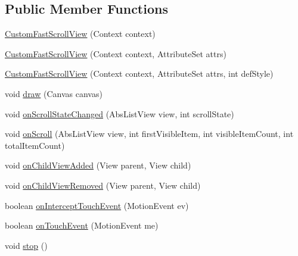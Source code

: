 \subsection*{Public Member Functions}
\begin{DoxyCompactItemize}
\item 
\hyperlink{classcom_1_1zia_1_1freshdocs_1_1widget_1_1fileexplorer_1_1_custom_fast_scroll_view_a114f68f78386547332db0fff12a2991c}{Custom\-Fast\-Scroll\-View} (Context context)
\item 
\hyperlink{classcom_1_1zia_1_1freshdocs_1_1widget_1_1fileexplorer_1_1_custom_fast_scroll_view_a99ae8d9d453d7d0a2f3802a06d158ce3}{Custom\-Fast\-Scroll\-View} (Context context, Attribute\-Set attrs)
\item 
\hyperlink{classcom_1_1zia_1_1freshdocs_1_1widget_1_1fileexplorer_1_1_custom_fast_scroll_view_af061f5da6dbf528f9f4c0c40cd817d33}{Custom\-Fast\-Scroll\-View} (Context context, Attribute\-Set attrs, int def\-Style)
\item 
void \hyperlink{classcom_1_1zia_1_1freshdocs_1_1widget_1_1fileexplorer_1_1_custom_fast_scroll_view_a68ebacb93e3d298573a817231efacf89}{draw} (Canvas canvas)
\item 
void \hyperlink{classcom_1_1zia_1_1freshdocs_1_1widget_1_1fileexplorer_1_1_custom_fast_scroll_view_a1ff6c4e50dbb20ccc50832903f2d0699}{on\-Scroll\-State\-Changed} (Abs\-List\-View view, int scroll\-State)
\item 
void \hyperlink{classcom_1_1zia_1_1freshdocs_1_1widget_1_1fileexplorer_1_1_custom_fast_scroll_view_a7bd566dc314f4a172d164b2edc3a3877}{on\-Scroll} (Abs\-List\-View view, int first\-Visible\-Item, int visible\-Item\-Count, int total\-Item\-Count)
\item 
void \hyperlink{classcom_1_1zia_1_1freshdocs_1_1widget_1_1fileexplorer_1_1_custom_fast_scroll_view_a409f6c2d1dc3374211dac21c1f67ea36}{on\-Child\-View\-Added} (View parent, View child)
\item 
void \hyperlink{classcom_1_1zia_1_1freshdocs_1_1widget_1_1fileexplorer_1_1_custom_fast_scroll_view_ad55999e80dbfc725dfe531cb2e092e52}{on\-Child\-View\-Removed} (View parent, View child)
\item 
boolean \hyperlink{classcom_1_1zia_1_1freshdocs_1_1widget_1_1fileexplorer_1_1_custom_fast_scroll_view_ab3e520889684661f2fb9c4db11c9a503}{on\-Intercept\-Touch\-Event} (Motion\-Event ev)
\item 
boolean \hyperlink{classcom_1_1zia_1_1freshdocs_1_1widget_1_1fileexplorer_1_1_custom_fast_scroll_view_a62c79de01209a48442cb9f3bfa36752d}{on\-Touch\-Event} (Motion\-Event me)
\item 
void \hyperlink{classcom_1_1zia_1_1freshdocs_1_1widget_1_1fileexplorer_1_1_custom_fast_scroll_view_a775b93725a5483f3210cad9b849b4788}{stop} ()
\end{DoxyCompactItemize}
